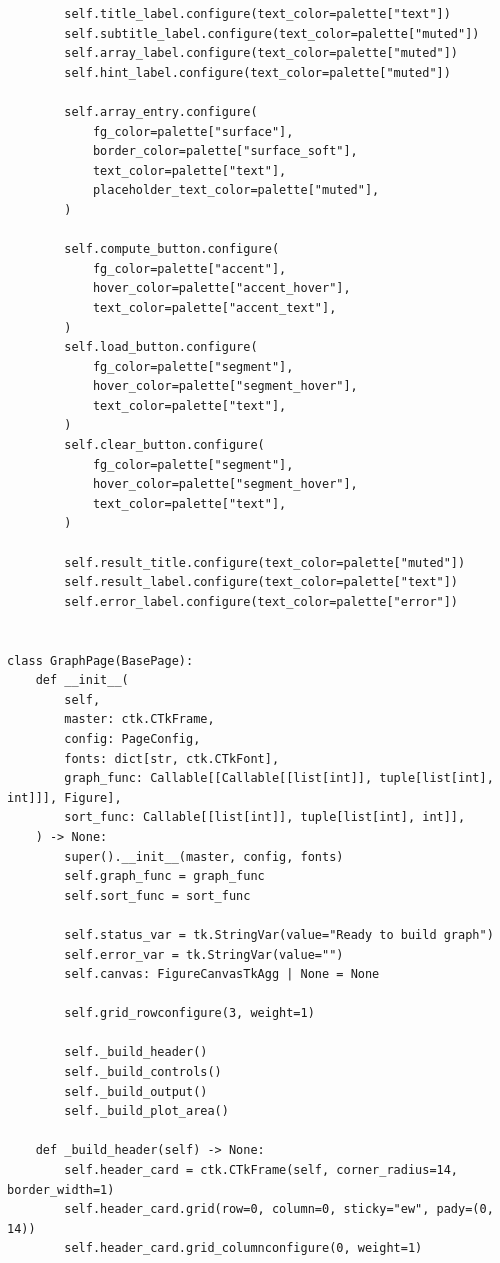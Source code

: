 \documentclass[12pt,a4paper]{article}
\begin{document}
\begin{verbatim}
        self.title_label.configure(text_color=palette["text"])
        self.subtitle_label.configure(text_color=palette["muted"])
        self.array_label.configure(text_color=palette["muted"])
        self.hint_label.configure(text_color=palette["muted"])

        self.array_entry.configure(
            fg_color=palette["surface"],
            border_color=palette["surface_soft"],
            text_color=palette["text"],
            placeholder_text_color=palette["muted"],
        )

        self.compute_button.configure(
            fg_color=palette["accent"],
            hover_color=palette["accent_hover"],
            text_color=palette["accent_text"],
        )
        self.load_button.configure(
            fg_color=palette["segment"],
            hover_color=palette["segment_hover"],
            text_color=palette["text"],
        )
        self.clear_button.configure(
            fg_color=palette["segment"],
            hover_color=palette["segment_hover"],
            text_color=palette["text"],
        )

        self.result_title.configure(text_color=palette["muted"])
        self.result_label.configure(text_color=palette["text"])
        self.error_label.configure(text_color=palette["error"])


class GraphPage(BasePage):
    def __init__(
        self,
        master: ctk.CTkFrame,
        config: PageConfig,
        fonts: dict[str, ctk.CTkFont],
        graph_func: Callable[[Callable[[list[int]], tuple[list[int], int]]], Figure],
        sort_func: Callable[[list[int]], tuple[list[int], int]],
    ) -> None:
        super().__init__(master, config, fonts)
        self.graph_func = graph_func
        self.sort_func = sort_func

        self.status_var = tk.StringVar(value="Ready to build graph")
        self.error_var = tk.StringVar(value="")
        self.canvas: FigureCanvasTkAgg | None = None

        self.grid_rowconfigure(3, weight=1)

        self._build_header()
        self._build_controls()
        self._build_output()
        self._build_plot_area()

    def _build_header(self) -> None:
        self.header_card = ctk.CTkFrame(self, corner_radius=14, border_width=1)
        self.header_card.grid(row=0, column=0, sticky="ew", pady=(0, 14))
        self.header_card.grid_columnconfigure(0, weight=1)


\end{verbatim}
\end{document}
